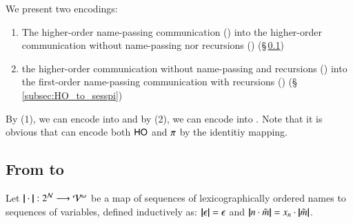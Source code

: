 We present two encodings:
\begin{enumerate}
\item The higher-order name-passing communication (\HOp) into 
the higher-order communication without name-passing nor 
recursions (\HO) (\S\,\ref{subsec:HOpi_to_HO})
\item the higher-order communication without 
name-passing and recursions (\HO)
into the first-order name-passing communication
with recursions (\sessp) (\S\,\ref{subsec:HO_to_sesspi})
\end{enumerate}
By (1), we can encode \sessp into \HO and by (2), 
we can encode \HOp into \sessp.  
Note that it is obvious that \HOp can encode both 
$\mathsf{HO}$ and $\pi$ by the identitiy mapping. 

\subsection{From \HOp to \HO}
\label{subsec:HOpi_to_HO}

\begin{definition}\rm 
	Let $|\!|\cdot|\!|: 2^{\mathcal{N}} \longrightarrow \mathcal{V}^\omega$
	be a map of sequences of 
lexicographically ordered names to sequences of variables, defined
	inductively as: 
	$|\!|\epsilon|\!| = \epsilon$ and $|\!|n \cdot \tilde{m}|\!| = x_n \cdot |\!|\tilde{m}|\!|$. 
\end{definition}

